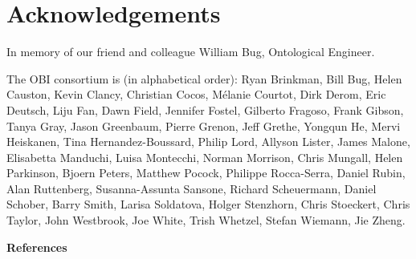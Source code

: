 \documentclass[a4paper,10pt,twocolumn]{article}
\begin{document}
\section*{Acknowledgements}

In memory of our friend and colleague William Bug, Ontological Engineer. 

The OBI consortium is (in alphabetical order): Ryan Brinkman, Bill Bug, Helen Causton, Kevin Clancy, Christian Cocos, M\'elanie Courtot, Dirk Derom, Eric Deutsch, Liju Fan, Dawn Field, Jennifer Fostel, Gilberto Fragoso, Frank Gibson, Tanya Gray, Jason Greenbaum, Pierre Grenon, Jeff Grethe, Yongqun He, Mervi Heiskanen, Tina Hernandez-Boussard, Philip Lord, Allyson Lister, James Malone, Elisabetta Manduchi, Luisa Montecchi, Norman Morrison, Chris Mungall, Helen Parkinson, Bjoern Peters, Matthew Pocock, Philippe Rocca-Serra, Daniel Rubin, Alan Ruttenberg, Susanna-Assunta Sansone, Richard Scheuermann, Daniel Schober, Barry Smith, Larisa Soldatova, Holger Stenzhorn, Chris Stoeckert, Chris Taylor, John Westbrook,  Joe White, Trish Whetzel, Stefan Wiemann, Jie Zheng. 

   

{\def\section*#1{}
\begin{center}
\textbf{References}
\end{center}

}
  \balance
\end{document}
